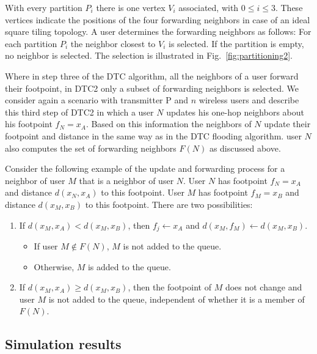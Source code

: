 With every partition $P_i$ there is one vertex $V_i$ associated, with $0\leq i\leq3$. These vertices indicate the positions of the four forwarding neighbors in case of an ideal square tiling topology. A user determines the forwarding neighbors as follows: For each partition $P_i$ the neighbor closest to $V_i$ is selected. If the partition is empty, no neighbor is selected. The selection is illustrated in Fig.~\ref{fig:partitioning2}.

Where in step three of the DTC algorithm, all the neighbors of a user forward their footpoint, in DTC2 only a subset of forwarding neighbors is selected. We consider again a scenario with transmitter P and $n$ wireless users and describe this third step of DTC2 in which a user $N$ updates his one-hop neighbors about his footpoint $f_N=x_A$. Based on this information the neighbors of $N$ update their footpoint and distance in the same way as in the DTC flooding algorithm. user $N$ also computes the set of forwarding neighbors $F(N)$ as discussed above. 

Consider the following example of the update and forwarding process for a neighbor of user $M$ that is a neighbor of user $N$. User $N$ has footpoint $f_N=x_A$ and distance $d(x_N,x_A)$ to this footpoint. User $M$ has footpoint $f_M=x_B$ and distance $d(x_M,x_B)$ to this footpoint. There are two possibilities:

\begin{enumerate}
\item If $d(x_M,x_A) < d(x_M,x_B)$, then $f_j \leftarrow x_A$ and $d(x_M,f_M) \leftarrow d(x_M,x_B)$. 
	\begin{itemize}
	\item If user $M \not\in F(N)$, $M$ is not added to the queue.
	\item Otherwise, $M$ is added to the queue.
	\end{itemize}
\item If $d(x_M,x_A) \geq d(x_M,x_B)$, then the footpoint of $M$ does not change and user $M$ is not added to the queue, independent of whether it is a member of $F(N)$.
\end{enumerate}
 
\subsection{Simulation results}



